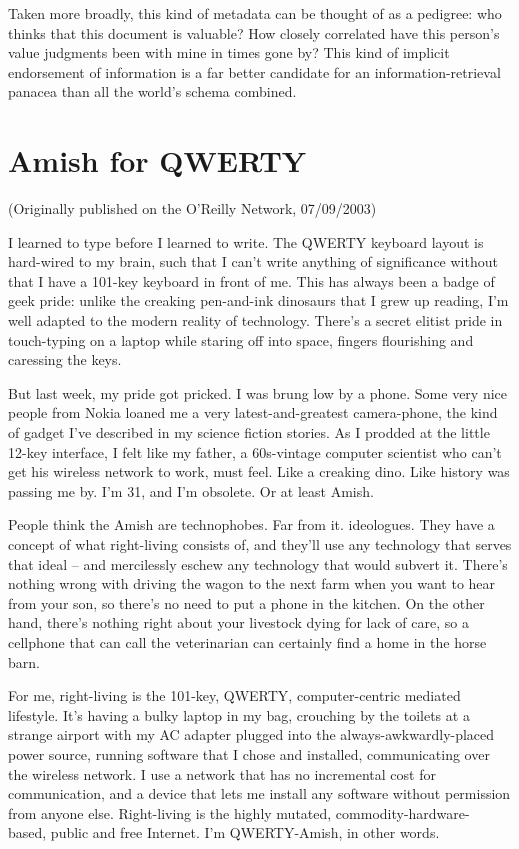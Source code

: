 Taken more broadly, this kind of metadata can be thought of as a
pedigree: who thinks that this document is valuable? How closely
correlated have this person's value judgments been with mine in
times gone by? This kind of implicit endorsement of information is
a far better candidate for an information-retrieval panacea than
all the world's schema combined.

\section{Amish for QWERTY}

(Originally published on the O'Reilly Network, 07/09/2003)

I learned to type before I learned to write. The QWERTY keyboard
layout is hard-wired to my brain, such that I can't write anything
of significance without that I have a 101-key keyboard in front of
me. This has always been a badge of geek pride: unlike the creaking
pen-and-ink dinosaurs that I grew up reading, I'm well adapted to
the modern reality of technology. There's a secret elitist pride in
touch-typing on a laptop while staring off into space, fingers
flourishing and caressing the keys.

But last week, my pride got pricked. I was brung low by a phone.
Some very nice people from Nokia loaned me a very
latest-and-greatest camera-phone, the kind of gadget I've described
in my science fiction stories. As I prodded at the little 12-key
interface, I felt like my father, a 60s-vintage computer scientist
who can't get his wireless network to work, must feel. Like a
creaking dino. Like history was passing me by. I'm 31, and I'm
obsolete. Or at least Amish.

People think the Amish are technophobes. Far from it.
ideologues. They have a concept of what right-living consists of,
and they'll use any technology that serves that ideal -- and
mercilessly eschew any technology that would subvert it. There's
nothing wrong with driving the wagon to the next farm when you want
to hear from your son, so there's no need to put a phone in the
kitchen. On the other hand, there's nothing right about your
livestock dying for lack of care, so a cellphone that can call the
veterinarian can certainly find a home in the horse barn.

For me, right-living is the 101-key, QWERTY, computer-cen\-tric
mediated lifestyle. It's having a bulky laptop in my bag, crouching
by the toilets at a strange airport with my AC adapter plugged into
the always-awkwardly-placed power source, running software that I
chose and installed, communicating over the wireless network. I use
a network that has no incremental cost for communication, and a
device that lets me install any software without permission from
anyone else. Right-living is the highly mutated,
commodity-hardware- based, public and free Internet. I'm
QWERTY-Amish, in other words.

